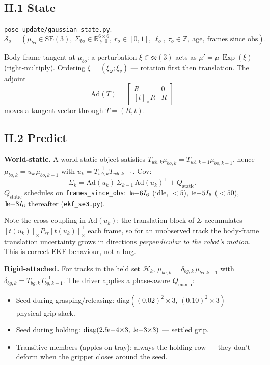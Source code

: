 \documentclass[11pt]{article}
\DeclareMathOperator{\Exp}{Exp}
\newcommand{\R}{\mathbb{R}}
\newcommand{\SE}{\mathrm{SE}(3)}
\newcommand{\se}{\mathfrak{se}(3)}
\newcommand{\Ad}{\mathrm{Ad}}
\newcommand{\file}[1]{\texttt{#1}}
\begin{document}
\subsection*{II.1 State}

\file{pose\_update/gaussian\_state.py}.
$$\mathcal{S}_o = (\mu_{bo}\in\SE,\ \Sigma_{bo}\in\R^{6\times 6}_{\succeq 0},\
  r_o\in[0,1],\ \ell_o,\ \tau_o\in\mathbb{Z},\ \text{age},\ \text{frames\_since\_obs}).$$

Body-frame tangent at $\mu_{bo}$: a perturbation $\xi\in\se$ acts as
$\mu' = \mu\,\Exp(\xi)$ (right-multiply). Ordering
$\xi=(\xi_\omega;\xi_v)$ — rotation first then translation. The adjoint
$$\Ad(T) = \begin{bmatrix} R & 0 \\ [t]_\times R & R \end{bmatrix}$$
moves a tangent vector through $T=(R,t)$.

\subsection*{II.2 Predict}

\textbf{World-static.} A world-static object satisfies
$T_{wb,k}\mu_{bo,k} = T_{wb,k-1}\mu_{bo,k-1}$, hence
$\mu_{bo,k} = u_k\,\mu_{bo,k-1}$ with
$u_k = T_{wb,k}^{-1}T_{wb,k-1}$. Cov:
$$\Sigma_k = \Ad(u_k)\,\Sigma_{k-1}\,\Ad(u_k)^\top + Q_{\text{static}}.$$
$Q_{\text{static}}$ schedules on \texttt{frames\_since\_obs}:
$1\!{\rm e}{-6}I_6$ (idle, $<5$), $1\!{\rm e}{-5}I_6$ ($<50$),
$1\!{\rm e}{-8}I_6$ thereafter (\file{ekf\_se3.py}).

Note the cross-coupling in $\Ad(u_k)$: the translation block of
$\Sigma$ accumulates $[t(u_k)]_\times P_{rr}[t(u_k)]_\times^\top$ each
frame, so for an unobserved track the body-frame translation
uncertainty grows in directions \emph{perpendicular to the robot's
motion}. This is correct EKF behaviour, not a bug.

\textbf{Rigid-attached.} For tracks in the held set $\mathcal{H}_k$,
$\mu_{bo,k} = \delta_{bg,k}\,\mu_{bo,k-1}$ with
$\delta_{bg,k} = T_{bg,k}T_{bg,k-1}^{-1}$. The driver applies a
phase-aware $Q_{\text{manip}}$:
\begin{itemize}
\item Seed during grasping/releasing: $\mathrm{diag}((0.02)^2{\times}3,\,(0.10)^2{\times}3)$ — physical grip-slack.
\item Seed during holding: $\mathrm{diag}(2.5\!{\rm e}{-4}{\times}3,\,1\!{\rm e}{-3}{\times}3)$ — settled grip.
\item Transitive members (apples on tray): always the holding row — they don't deform when the gripper closes around the seed.
\end{itemize}
\end{document}
